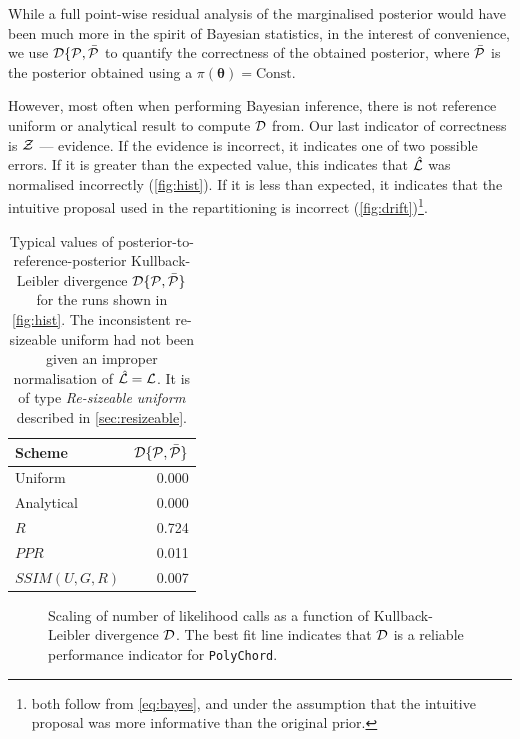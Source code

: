 \documentclass[usenatbib]{mnras}
\begin{document}
While a full point-wise residual analysis of the marginalised
posterior would have been much more in the spirit of Bayesian
statistics, in the interest of convenience, we use
${\cal D}\{ {\cal P}, \bar{\cal P}$ to quantify the correctness of the
obtained posterior, where $\bar{\cal P}$ is the posterior obtained
using a $\pi(\bm{\theta}) = \text{Const}$. 

However, most often when performing Bayesian inference, there is not
reference uniform or analytical result to compute ${\cal D}$ from. Our
last indicator of correctness is ${\cal Z}$ --- evidence. If the
evidence is incorrect, it indicates one of two possible errors. If it
is greater than the expected value, this indicates that
$\hat{\cal L}$ was normalised incorrectly (\cref{fig:hist}). If it
is less than expected, it indicates that the intuitive proposal used in
the repartitioning is incorrect (\cref{fig:drift})\footnote{both
  follow from \cref{eq:bayes}, and under the assumption that the
  intuitive proposal was more informative than the original prior. }.


\begin{table}
  \centering
  
  \caption{Typical values of posterior-to-reference-posterior
    Kullback-Leibler divergence ${\cal D}\{{\cal P}, \bar{\cal P}\}$
    for the runs shown in \cref{fig:hist}. The inconsistent
    re-sizeable uniform had not been given an improper normalisation
    of $\hat{\cal L} = {\cal L}$. It is of type \emph{Re-sizeable
      uniform} described in \cref{sec:resizeable}.}
  \begin{tabular}{lr}
    \textbf{Scheme} & ${\cal D}\{ {\cal P}, \bar{\cal P}\}$\\
    \hline
    Uniform & 0.000\\
    Analytical & 0.000\\
    $R$ & 0.724\\
    $PPR$ & 0.011\\
    $SSIM(U, G, R)$ & 0.007\\
  \end{tabular}
  \label{tab:hist}
\end{table}




\begin{figure}
  
\caption{Scaling of number of likelihood calls as a function of Kullback-Leibler divergence \({\cal D}\). The best fit line indicates that \({\cal D}\) is a reliable performance indicator for \texttt{PolyChord}.\label{fig:kl-scaling}}
\end{figure}
\end{document}
